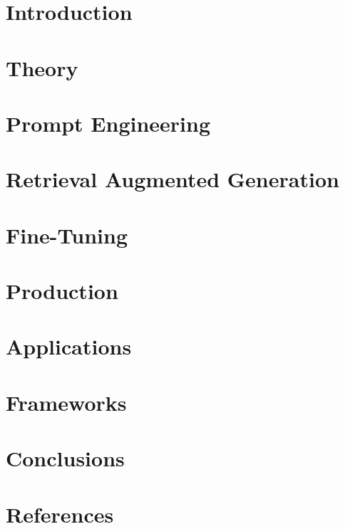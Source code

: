 \section[Intro]{Introduction}


\section[Theory]{Theory}






\section[Prompts]{Prompt Engineering}







\section[RAG]{Retrieval Augmented Generation}





\section[FT]{Fine-Tuning}


\section[Prod]{Production}





\section[Apps]{Applications}



\section[Frameworks]{Frameworks}








\section[Concl]{Conclusions}


\section[Refs]{References}


